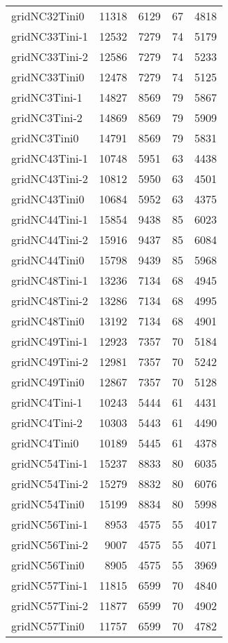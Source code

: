 \begin{longtable}{lrrrr}
gridNC32Tini0 & 11318 & 6129 & 67 & 4818 \\
gridNC33Tini-1 & 12532 & 7279 & 74 & 5179 \\
gridNC33Tini-2 & 12586 & 7279 & 74 & 5233 \\
gridNC33Tini0 & 12478 & 7279 & 74 & 5125 \\
gridNC3Tini-1 & 14827 & 8569 & 79 & 5867 \\
gridNC3Tini-2 & 14869 & 8569 & 79 & 5909 \\
gridNC3Tini0 & 14791 & 8569 & 79 & 5831 \\
gridNC43Tini-1 & 10748 & 5951 & 63 & 4438 \\
gridNC43Tini-2 & 10812 & 5950 & 63 & 4501 \\
gridNC43Tini0 & 10684 & 5952 & 63 & 4375 \\
gridNC44Tini-1 & 15854 & 9438 & 85 & 6023 \\
gridNC44Tini-2 & 15916 & 9437 & 85 & 6084 \\
gridNC44Tini0 & 15798 & 9439 & 85 & 5968 \\
gridNC48Tini-1 & 13236 & 7134 & 68 & 4945 \\
gridNC48Tini-2 & 13286 & 7134 & 68 & 4995 \\
gridNC48Tini0 & 13192 & 7134 & 68 & 4901 \\
gridNC49Tini-1 & 12923 & 7357 & 70 & 5184 \\
gridNC49Tini-2 & 12981 & 7357 & 70 & 5242 \\
gridNC49Tini0 & 12867 & 7357 & 70 & 5128 \\
gridNC4Tini-1 & 10243 & 5444 & 61 & 4431 \\
gridNC4Tini-2 & 10303 & 5443 & 61 & 4490 \\
gridNC4Tini0 & 10189 & 5445 & 61 & 4378 \\
gridNC54Tini-1 & 15237 & 8833 & 80 & 6035 \\
gridNC54Tini-2 & 15279 & 8832 & 80 & 6076 \\
gridNC54Tini0 & 15199 & 8834 & 80 & 5998 \\
gridNC56Tini-1 & 8953 & 4575 & 55 & 4017 \\
gridNC56Tini-2 & 9007 & 4575 & 55 & 4071 \\
gridNC56Tini0 & 8905 & 4575 & 55 & 3969 \\
gridNC57Tini-1 & 11815 & 6599 & 70 & 4840 \\
gridNC57Tini-2 & 11877 & 6599 & 70 & 4902 \\
gridNC57Tini0 & 11757 & 6599 & 70 & 4782 \\

\end{longtable}
